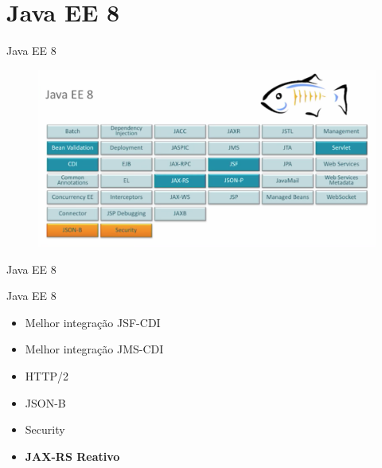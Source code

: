 \documentclass{beamer}
\begin{document}
\section{Java EE 8}
\begin{frame}{Java EE 8}
\begin{figure}
	\centering
	\includegraphics[width=\linewidth]{Images/javaee8}
\end{figure}
\end{frame}

\begin{frame}{Java EE 8}
\begin{alertblock}{Java EE 8}
\begin{itemize}
	\item Melhor integração JSF-CDI
	\item Melhor integração JMS-CDI
	\item HTTP/2
	\item JSON-B
	\item Security
	\item \textbf{JAX-RS Reativo}
\end{itemize}
\end{alertblock}
\end{frame}
\end{document}
